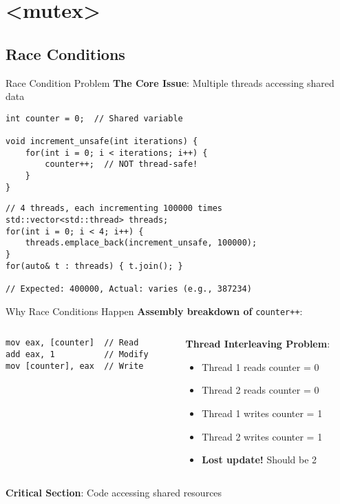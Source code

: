 \section{<mutex>}

\subsection{Race Conditions}
\begin{frame}[fragile]{Race Condition Problem}
	\textbf{The Core Issue}: Multiple threads accessing shared data

	\begin{verbatim}
int counter = 0;  // Shared variable

void increment_unsafe(int iterations) {
    for(int i = 0; i < iterations; i++) {
        counter++;  // NOT thread-safe!
    }
}
	\end{verbatim}

	\begin{verbatim}
// 4 threads, each incrementing 100000 times
std::vector<std::thread> threads;
for(int i = 0; i < 4; i++) {
    threads.emplace_back(increment_unsafe, 100000);
}
for(auto& t : threads) { t.join(); }

// Expected: 400000, Actual: varies (e.g., 387234)
	\end{verbatim}
\end{frame}

\begin{frame}[fragile]{Why Race Conditions Happen}
	\textbf{Assembly breakdown of} \texttt{counter++}:

	\begin{columns}
		\begin{column}{0.4\textwidth}
			\begin{verbatim}
mov eax, [counter]  // Read
add eax, 1          // Modify
mov [counter], eax  // Write
			\end{verbatim}
		\end{column}
		\begin{column}{0.6\textwidth}
			\textbf{Thread Interleaving Problem}:
			\begin{itemize}
				\item Thread 1 reads counter = 0
				\item Thread 2 reads counter = 0
				\item Thread 1 writes counter = 1
				\item Thread 2 writes counter = 1
				\item \textbf{Lost update!} Should be 2
			\end{itemize}
		\end{column}
	\end{columns}

	\vspace{0.5em}
	\textbf{Critical Section}: Code accessing shared resources
\end{frame}

